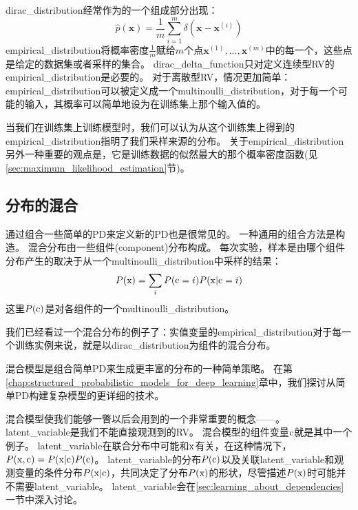 \gls{dirac_distribution}经常作为的一个组成部分出现：
\begin{equation}
\hat{p}(\bm{x}) = \frac{1}{m} \sum_{i=1}^m \delta(\bm{x} - \bm{x}^{(i)})
\end{equation}
\gls{empirical_distribution}将概率密度$\frac{1}{m}$赋给$m$个点$\bm{x}^{(1)}, \ldots, \bm{x}^{(m)}$中的每一个，这些点是给定的数据集或者采样的集合。
\gls{dirac_delta_function}只对定义连续型\gls{RV}的\gls{empirical_distribution}是必要的。
对于离散型\gls{RV}，情况更加简单：\gls{empirical_distribution}可以被定义成一个\gls{multinoulli_distribution}，对于每一个可能的输入，其概率可以简单地设为在训练集上那个输入值的。

当我们在训练集上训练模型时，我们可以认为从这个训练集上得到的\gls{empirical_distribution}指明了我们采样来源的分布。
关于\gls{empirical_distribution}另外一种重要的观点是，它是训练数据的似然最大的那个概率密度函数(见\ref{sec:maximum_likelihood_estimation}节)。

\subsection{分布的混合}
\label{sec:mixtures_of_distributions}

通过组合一些简单的\gls{PD}来定义新的\gls{PD}也是很常见的。
一种通用的组合方法是构造。
混合分布由一些组件(component)分布构成。
每次实验，样本是由哪个组件分布产生的取决于从一个\gls{multinoulli_distribution}中采样的结果：
\begin{equation}
P(\mathrm{x}) = \sum_i P(\mathrm{c} = i) P(\mathrm{x} | \mathrm{c} = i)
\end{equation}
这里$P(\mathrm{c})$是对各组件的一个\gls{multinoulli_distribution}。

我们已经看过一个混合分布的例子了：实值变量的\gls{empirical_distribution}对于每一个训练实例来说，就是以\gls{dirac_distribution}为组件的混合分布。


混合模型是组合简单\gls{PD}来生成更丰富的分布的一种简单策略。
在第\ref{chap:structured_probabilistic_models_for_deep_learning}章中，我们探讨从简单\gls{PD}构建复杂模型的更详细的技术。

混合模型使我们能够一瞥以后会用到的一个非常重要的概念——。
\gls{latent_variable}是我们不能直接观测到的\gls{RV}。
混合模型的组件变量$\mathrm{c}$就是其中一个例子。
\gls{latent_variable}在联合分布中可能和$\mathrm{x}$有关，在这种情况下，$P(\mathrm{x}, \mathrm{c}) = P(\mathrm{x} | \mathrm{c})P(\mathrm{c})$。
\gls{latent_variable}的分布$P(\mathrm{c})$以及关联\gls{latent_variable}和观测变量的条件分布$P(\mathrm{x} |\mathrm{c})$，共同决定了分布$P(\mathrm{x})$的形状，尽管描述$P(\mathrm{x})$时可能并不需要\gls{latent_variable}。
\gls{latent_variable}会在\ref{sec:learning_about_dependencies}一节中深入讨论。

